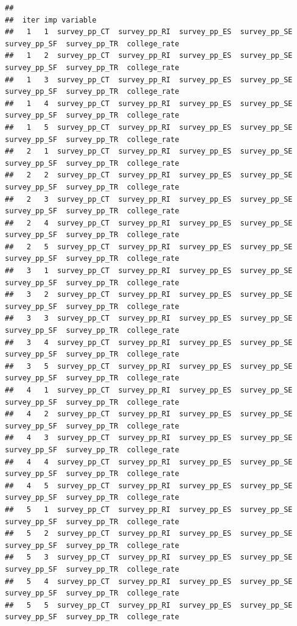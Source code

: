 \documentclass[
  man]{apa6}
\begin{document}
\begin{verbatim}
## 
##  iter imp variable
##   1   1  survey_pp_CT  survey_pp_RI  survey_pp_ES  survey_pp_SE  survey_pp_SF  survey_pp_TR  college_rate
##   1   2  survey_pp_CT  survey_pp_RI  survey_pp_ES  survey_pp_SE  survey_pp_SF  survey_pp_TR  college_rate
##   1   3  survey_pp_CT  survey_pp_RI  survey_pp_ES  survey_pp_SE  survey_pp_SF  survey_pp_TR  college_rate
##   1   4  survey_pp_CT  survey_pp_RI  survey_pp_ES  survey_pp_SE  survey_pp_SF  survey_pp_TR  college_rate
##   1   5  survey_pp_CT  survey_pp_RI  survey_pp_ES  survey_pp_SE  survey_pp_SF  survey_pp_TR  college_rate
##   2   1  survey_pp_CT  survey_pp_RI  survey_pp_ES  survey_pp_SE  survey_pp_SF  survey_pp_TR  college_rate
##   2   2  survey_pp_CT  survey_pp_RI  survey_pp_ES  survey_pp_SE  survey_pp_SF  survey_pp_TR  college_rate
##   2   3  survey_pp_CT  survey_pp_RI  survey_pp_ES  survey_pp_SE  survey_pp_SF  survey_pp_TR  college_rate
##   2   4  survey_pp_CT  survey_pp_RI  survey_pp_ES  survey_pp_SE  survey_pp_SF  survey_pp_TR  college_rate
##   2   5  survey_pp_CT  survey_pp_RI  survey_pp_ES  survey_pp_SE  survey_pp_SF  survey_pp_TR  college_rate
##   3   1  survey_pp_CT  survey_pp_RI  survey_pp_ES  survey_pp_SE  survey_pp_SF  survey_pp_TR  college_rate
##   3   2  survey_pp_CT  survey_pp_RI  survey_pp_ES  survey_pp_SE  survey_pp_SF  survey_pp_TR  college_rate
##   3   3  survey_pp_CT  survey_pp_RI  survey_pp_ES  survey_pp_SE  survey_pp_SF  survey_pp_TR  college_rate
##   3   4  survey_pp_CT  survey_pp_RI  survey_pp_ES  survey_pp_SE  survey_pp_SF  survey_pp_TR  college_rate
##   3   5  survey_pp_CT  survey_pp_RI  survey_pp_ES  survey_pp_SE  survey_pp_SF  survey_pp_TR  college_rate
##   4   1  survey_pp_CT  survey_pp_RI  survey_pp_ES  survey_pp_SE  survey_pp_SF  survey_pp_TR  college_rate
##   4   2  survey_pp_CT  survey_pp_RI  survey_pp_ES  survey_pp_SE  survey_pp_SF  survey_pp_TR  college_rate
##   4   3  survey_pp_CT  survey_pp_RI  survey_pp_ES  survey_pp_SE  survey_pp_SF  survey_pp_TR  college_rate
##   4   4  survey_pp_CT  survey_pp_RI  survey_pp_ES  survey_pp_SE  survey_pp_SF  survey_pp_TR  college_rate
##   4   5  survey_pp_CT  survey_pp_RI  survey_pp_ES  survey_pp_SE  survey_pp_SF  survey_pp_TR  college_rate
##   5   1  survey_pp_CT  survey_pp_RI  survey_pp_ES  survey_pp_SE  survey_pp_SF  survey_pp_TR  college_rate
##   5   2  survey_pp_CT  survey_pp_RI  survey_pp_ES  survey_pp_SE  survey_pp_SF  survey_pp_TR  college_rate
##   5   3  survey_pp_CT  survey_pp_RI  survey_pp_ES  survey_pp_SE  survey_pp_SF  survey_pp_TR  college_rate
##   5   4  survey_pp_CT  survey_pp_RI  survey_pp_ES  survey_pp_SE  survey_pp_SF  survey_pp_TR  college_rate
##   5   5  survey_pp_CT  survey_pp_RI  survey_pp_ES  survey_pp_SE  survey_pp_SF  survey_pp_TR  college_rate
\end{verbatim}
\end{document}
